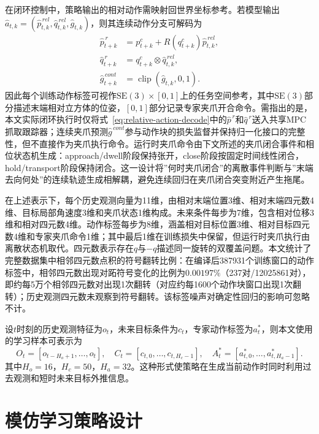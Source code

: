 在闭环控制中，策略输出的相对动作需映射回世界坐标参考。若模型输出$\hat{a}_{t,k}=(\hat{p}^{\,rel}_{t,k},\hat{q}^{\,rel}_{t,k},\hat{g}_{t,k})$，则其连续动作分支可解码为
\begin{align}
    \hat{p}^{\,r}_{t+k} &= p^c_{t+k}+R(q^c_{t+k})\hat{p}^{\,rel}_{t,k}, \\
    \hat{q}^{\,r}_{t+k} &= q^c_{t+k}\otimes \hat{q}^{\,rel}_{t,k}, \\
    \hat{g}^{\,cont}_{t+k} &= \operatorname{clip}(\hat{g}_{t,k},0,1).
    \label{eq:relative-action-decode}
\end{align}
因此每个训练动作标签可视作$\mathrm{SE}(3)\times[0,1]$上的任务空间参考，其中$\mathrm{SE}(3)$部分描述末端相对立方体的位姿，$[0,1]$部分记录专家夹爪开合命令。需指出的是，本文实际闭环执行时仅将式~\eqref{eq:relative-action-decode}中的$\hat{p}^{\,r}$和$\hat{q}^{\,r}$送入共享MPC抓取跟踪器；连续夹爪预测$\hat{g}^{\,cont}$参与动作块的损失监督并保持归一化接口的完整性，但不直接作为夹爪执行命令。运行时夹爪命令由下文所述的夹爪闭合事件和相位状态机生成：approach/dwell阶段保持张开，close阶段按固定时间线性闭合，hold/transport阶段保持闭合。这一设计将”何时夹爪闭合”的离散事件判断与”末端去向何处”的连续轨迹生成相解耦，避免连续回归在夹爪闭合突变附近产生拖尾。

在上述表示下，每个历史观测向量为11维，由相对末端位置3维、相对末端四元数4维、目标局部角速度3维和夹爪状态1维构成。未来条件每步为7维，包含相对位移3维和相对四元数4维。动作标签每步为8维，涵盖相对目标位置3维、相对目标四元数4维和专家夹爪命令1维；其中最后1维在训练损失中保留，但运行时夹爪执行由离散状态机取代。四元数表示存在$q$与$-q$描述同一旋转的双覆盖问题。本文统计了完整数据集中相邻四元数点积的符号翻转比例：在编译后387931个训练窗口的动作标签中，相邻四元数出现对跖符号变化的比例为$0.00197\%$（237对/12025861对），即约每5万个相邻四元数对出现1次翻转（对应约每1600个动作块窗口出现1次翻转）；历史观测四元数未观察到符号翻转。该标签噪声对确定性回归的影响可忽略不计。

设$t$时刻的历史观测特征为$o_t$，未来目标条件为$c_t$，专家动作标签为$a_t^*$，则本文使用的学习样本可表示为
\begin{equation}
    O_t=\left[o_{t-H_o+1},\ldots,o_t\right],\quad
    C_t=\left[c_{t,0},\ldots,c_{t,H_c-1}\right],\quad
    A_t^*=\left[a^*_{t,0},\ldots,a^*_{t,H_a-1}\right].
    \label{eq:training-sample}
\end{equation}
其中$H_o=16$，$H_c=50$，$H_a=32$。这种形式使策略在生成当前动作时同时利用过去观测和短时未来目标外推信息。

\section{模仿学习策略设计}

